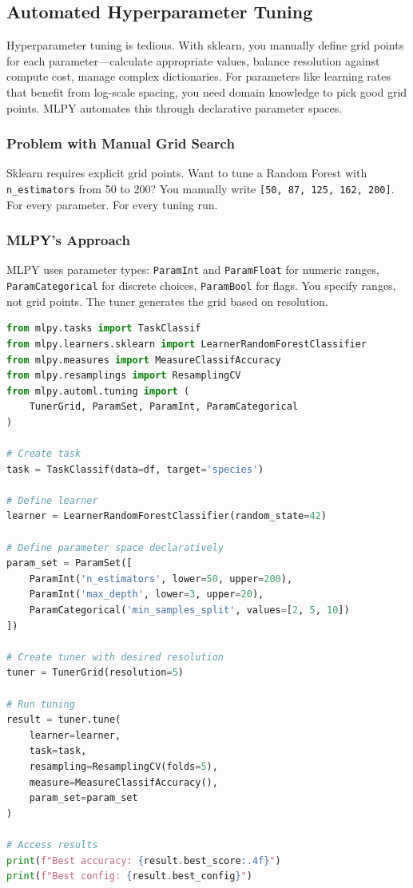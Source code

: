 \subsection{Automated Hyperparameter Tuning}
\label{sec:automl_tuning}

Hyperparameter tuning is tedious. With sklearn, you manually define grid points
for each parameter---calculate appropriate values, balance resolution against
compute cost, manage complex dictionaries. For parameters like learning rates
that benefit from log-scale spacing, you need domain knowledge to pick good grid
points. MLPY automates this through declarative parameter spaces.

\subsubsection{Problem with Manual Grid Search}

Sklearn requires explicit grid points. Want to tune a Random Forest with
\texttt{n\_estimators} from 50 to 200? You manually write
\texttt{[50, 87, 125, 162, 200]}. For every parameter. For every tuning run.

\subsubsection{MLPY's Approach}

MLPY uses parameter types: \texttt{ParamInt} and \texttt{ParamFloat} for numeric
ranges, \texttt{ParamCategorical} for discrete choices, \texttt{ParamBool} for
flags. You specify ranges, not grid points. The tuner generates the grid based
on resolution.

\begin{lstlisting}[language=Python, caption={MLPY automated hyperparameter tuning for Random Forest}]
from mlpy.tasks import TaskClassif
from mlpy.learners.sklearn import LearnerRandomForestClassifier
from mlpy.measures import MeasureClassifAccuracy
from mlpy.resamplings import ResamplingCV
from mlpy.automl.tuning import (
    TunerGrid, ParamSet, ParamInt, ParamCategorical
)

# Create task
task = TaskClassif(data=df, target='species')

# Define learner
learner = LearnerRandomForestClassifier(random_state=42)

# Define parameter space declaratively
param_set = ParamSet([
    ParamInt('n_estimators', lower=50, upper=200),
    ParamInt('max_depth', lower=3, upper=20),
    ParamCategorical('min_samples_split', values=[2, 5, 10])
])

# Create tuner with desired resolution
tuner = TunerGrid(resolution=5)

# Run tuning
result = tuner.tune(
    learner=learner,
    task=task,
    resampling=ResamplingCV(folds=5),
    measure=MeasureClassifAccuracy(),
    param_set=param_set
)

# Access results
print(f"Best accuracy: {result.best_score:.4f}")
print(f"Best config: {result.best_config}")
\end{lstlisting}

